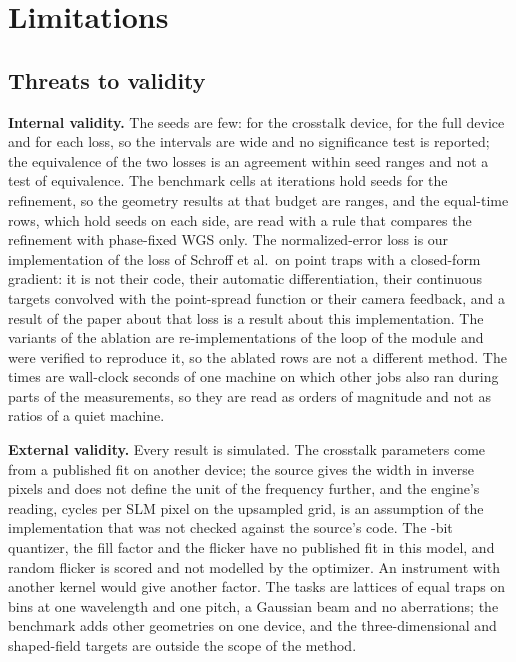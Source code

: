 \section{Limitations}\label{sec:limits}

\subsection{Threats to validity}

\textbf{Internal validity.} The seeds are few: \nSeedsOne{} for the crosstalk device, \nSeedsOneFull{} for the full device and \schroffXN{} for each loss, so the intervals are wide and no significance test is reported; the equivalence of the two losses is an agreement within seed ranges and not a test of equivalence. The benchmark cells at \benchOneBudget{} iterations hold \benchOneDevSeeds{} seeds for the refinement, so the geometry results at that budget are ranges, and the equal-time rows, which hold \benchOneWinMinSeeds{} seeds on each side, are read with a rule that compares the refinement with phase-fixed WGS only. The normalized-error loss is our implementation of the loss of Schroff et al.\ on point traps with a closed-form gradient: it is not their code, their automatic differentiation, their continuous targets convolved with the point-spread function or their camera feedback, and a result of the paper about that loss is a result about this implementation. The variants of the ablation are re-implementations of the loop of the module and were verified to reproduce it, so the ablated rows are not a different method. The times are wall-clock seconds of one machine on which other jobs also ran during parts of the measurements, so they are read as orders of magnitude and not as ratios of a quiet machine.

\textbf{External validity.} Every result is simulated. The crosstalk parameters come from a published fit on another device; the source gives the width in inverse pixels and does not define the unit of the frequency further, and the engine's reading, cycles per SLM pixel on the upsampled grid, is an assumption of the implementation that was not checked against the source's code. The \parBits{}-bit quantizer, the fill factor and the flicker have no published fit in this model, and random flicker is scored and not modelled by the optimizer. An instrument with another kernel would give another factor. The tasks are lattices of equal traps on bins at one wavelength and one pitch, a Gaussian beam and no aberrations; the benchmark adds other geometries on one device, and the three-dimensional and shaped-field targets are outside the scope of the method.

